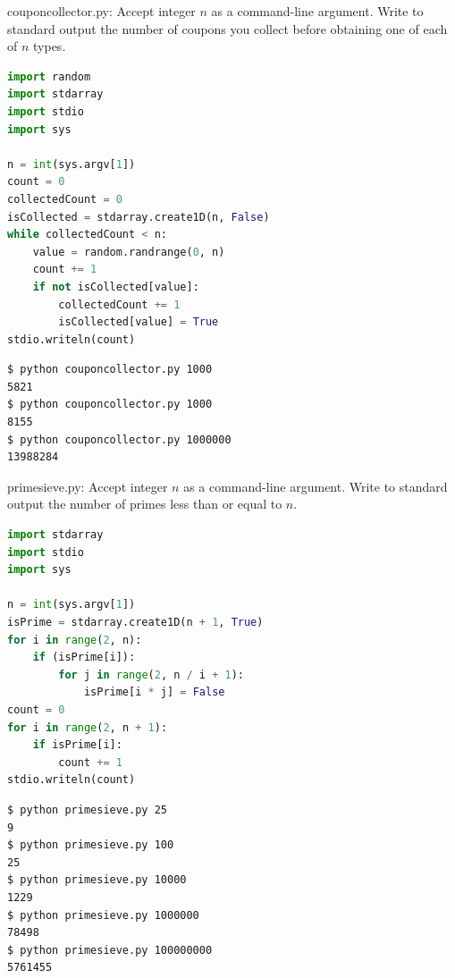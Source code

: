 \documentclass[8pt,a4paper,compress,handout]{beamer}
\begin{document}
\begin{frame}[fragile]
\begin{framed}
\tiny couponcollector.py: Accept integer $n$ as a command-line argument. Write to standard output the number of coupons you collect before obtaining one of each of $n$ types.
\end{framed}

\begin{lstlisting}[language=Python]
import random
import stdarray
import stdio
import sys

n = int(sys.argv[1])
count = 0
collectedCount = 0
isCollected = stdarray.create1D(n, False)
while collectedCount < n:
    value = random.randrange(0, n)
    count += 1
    if not isCollected[value]:
        collectedCount += 1
        isCollected[value] = True
stdio.writeln(count)
\end{lstlisting}

\begin{lstlisting}[language={}]
$ python couponcollector.py 1000
5821
$ python couponcollector.py 1000
8155
$ python couponcollector.py 1000000
13988284
\end{lstlisting}
\end{frame}

\begin{frame}[fragile]
\begin{framed}
\tiny primesieve.py: Accept integer $n$ as a command-line argument. Write to standard output the number of primes less than or equal to $n$.
\end{framed}

\begin{lstlisting}[language=Python]
import stdarray
import stdio
import sys

n = int(sys.argv[1])
isPrime = stdarray.create1D(n + 1, True)
for i in range(2, n):
    if (isPrime[i]):
        for j in range(2, n / i + 1):
            isPrime[i * j] = False
count = 0
for i in range(2, n + 1):
    if isPrime[i]:
        count += 1
stdio.writeln(count)
\end{lstlisting}

\begin{lstlisting}[language={}]
$ python primesieve.py 25
9
$ python primesieve.py 100
25
$ python primesieve.py 10000
1229
$ python primesieve.py 1000000
78498
$ python primesieve.py 100000000
5761455
\end{lstlisting}
\end{frame}
\end{document}
